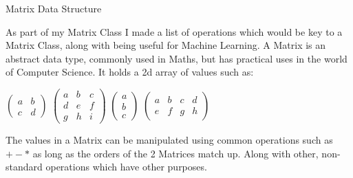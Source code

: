 \begin{flushleft}
\begin{enumerate}
            \vspace{1cm}
            {\Large Matrix Data Structure} \\
            \vspace{0.25cm}

            As part of my Matrix Class I made a list of operations which would be key to a Matrix Class, along with being useful
            for Machine Learning. A Matrix is an abstract data type, commonly used in Maths, but has practical uses in the world
            of Computer Science. It holds a 2d array of values such as: \\ 
            \begin{center}
            $\begin{pmatrix}
                a & b\\
                c & d
            \end{pmatrix}$ 
            $\begin{pmatrix}
                a & b & c \\
                d & e & f \\
                g & h & i 
            \end{pmatrix}$ 
            $\begin{pmatrix}
                a \\
                b \\
                c  
            \end{pmatrix}$ 
            $\begin{pmatrix}
                a & b & c & d\\
                e & f & g & h
            \end{pmatrix}$ 
            \end{center}
            The values in a Matrix can be manipulated using common operations such as $+ - *$ as long as the orders of the 2 Matrices
            match up. Along with other, non-standard operations which have other purposes.


\end{enumerate}
\end{flushleft}
